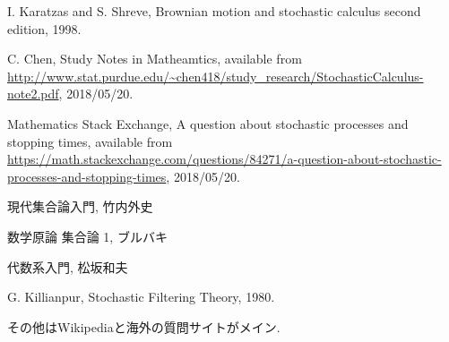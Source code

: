 \begin{thebibliography}{数字}
	 I. Karatzas and S. Shreve, Brownian motion and stochastic calculus second edition, 1998.
	
	 C. Chen, Study Notes in Matheamtics, available from \url{http://www.stat.purdue.edu/~chen418/study_research/StochasticCalculus-note2.pdf}, 2018/05/20.

	 Mathematics Stack Exchange, A question about stochastic processes and stopping times, available from \url{https://math.stackexchange.com/questions/84271/a-question-about-stochastic-processes-and-stopping-times}, 2018/05/20.
	
	 現代集合論入門, 竹内外史
	
	 数学原論 集合論 1, ブルバキ
	
	 代数系入門, 松坂和夫
	
	 G. Killianpur, Stochastic Filtering Theory, 1980. 
	
	 その他はWikipediaと海外の質問サイトがメイン.
\end{thebibliography}